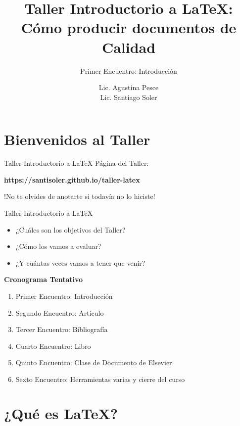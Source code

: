 \documentclass[11pt]{beamer}
\author{Lic. Agustina Pesce \\ Lic. Santiago Soler}
\title[Taller de {\LaTeX}]{Taller Introductorio a {\LaTeX}: \\ Cómo producir documentos de Calidad}
\subtitle{Primer Encuentro: Introducción}
\date{}
\begin{document}
\maketitle

\section{Bienvenidos al Taller}

\begin{frame}{Taller Introductorio a {\LaTeX}}
Página del Taller:
\begin{center}
\textbf{https://santisoler.github.io/taller-latex}
\end{center}

\begin{block}{}
\begin{center}
!No te olvides de anotarte si todavía no lo hiciste!
\end{center}
\end{block}
\end{frame}

\begin{frame}{Taller Introductorio a {\LaTeX}}
\begin{itemize}[<+- | alert@+>] %
  \item ¿Cuáles son los objetivos del Taller?
  \item ¿Cómo los vamos a evaluar?
  \item ¿Y cuántas veces vamos a tener que venir?
\end{itemize}

\pause
\textbf{Cronograma Tentativo}


\begin{enumerate}
  \item Primer Encuentro: Introducción
  \item Segundo Encuentro: Artículo
  \item Tercer Encuentro: Bibliografía
  \item Cuarto Encuentro: Libro
  \item Quinto Encuentro: Clase de Documento de Elsevier
  \item Sexto Encuentro: Herramientas varias y cierre del curso
\end{enumerate}

\end{frame}


\section{¿Qué es {\LaTeX}?}
\end{document}
